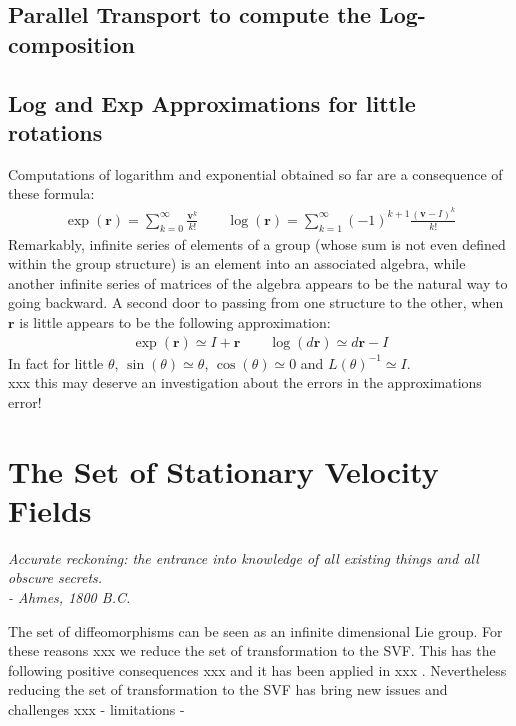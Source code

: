 \subsection{Parallel Transport to compute the Log-composition}




\subsection{Log and Exp Approximations for little rotations}
Computations of logarithm and exponential obtained so far are a consequence of these formula:
\begin{align*}
\exp(\mathbf{r}) = \sum_{k=0}^{\infty} \frac{\mathbf{v}^{k}}{k!}
\qquad 
\log(\mathbf{r}) = \sum_{k=1}^{\infty}(-1)^{k+1} \frac{(\mathbf{v}-I)^{k} }{k!}
\end{align*}
Remarkably, infinite series of elements of a group (whose sum is not even defined within the group structure) is an element into an associated algebra, while another infinite series of matrices of the algebra appears to be the natural way to going backward. A second door to passing from one structure to the other, when $\mathbf{r}$ is little appears to be the following approximation:
\begin{align*}
\exp(\mathbf{r}) \simeq I + \mathbf{r} 
\qquad 
\log(d\mathbf{r}) \simeq d\mathbf{r} - I
\end{align*}
In fact for little $\theta$, $\sin(\theta) \simeq \theta$, $\cos(\theta) \simeq 0 $ and $ L(\theta)^{-1} \simeq I$. \\
xxx this may deserve an investigation about the errors in the approximations error!




\section{The Set of Stationary Velocity Fields}\label{ch:svf}

\begin{flushright}
	\emph{Accurate reckoning: the entrance into knowledge of all existing things and all obscure secrets.\\
		- Ahmes, 1800 B.C.}
\end{flushright}

The set of diffeomorphisms can be seen as an infinite dimensional Lie group. For these reasons xxx we reduce the set of transformation to the SVF. This has the following positive consequences xxx and it has been applied in xxx . Nevertheless reducing the set of transformation to the SVF has bring new issues and challenges xxx - limitations - 

